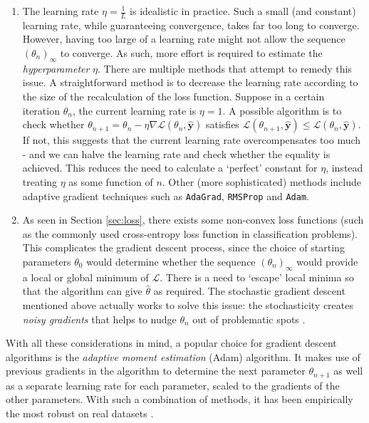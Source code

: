 \documentclass[a4paper,11pt,titlepage]{article}
\theoremstyle{definition}
\theoremstyle{plain}
\theoremstyle{remark}
\begin{document}
\begin{enumerate}
    \item The learning rate $\eta = \frac{1}{L}$ is idealistic in practice. Such a small (and constant) learning rate, while guaranteeing convergence, takes far too long to converge. However, having too large of a learning rate might not allow the sequence $(\theta_n)_\infty$ to converge. As such, more effort is required to estimate the \textit{hyperparameter} $\eta$. There are multiple methods that attempt to remedy this issue. A straightforward method is to decrease the learning rate according to the size of the recalculation of the loss function. Suppose in a certain iteration $\theta_n$, the current learning rate is $\eta = 1$. A possible algorithm is to check whether $\theta_{n+1} = \theta_n - \eta \nabla\mathcal{L}(\theta_n, \mathbf{\hat{y}})$ satisfies $\mathcal{L}(\theta_{n+1}, \mathbf{\hat{y}}) \leq \mathcal{L}(\theta_n, \mathbf{\hat{y}})$. If not, this suggests that the current learning rate overcompensates too much - and we can halve the learning rate and check whether the equality is achieved. This reduces the need to calculate a ‘perfect’ constant for $\eta$, instead treating $\eta$ as some function of $n$. Other (more sophisticated) methods include adaptive gradient techniques such as \texttt{AdaGrad}, \texttt{RMSProp} and \texttt{Adam}.

    \item As seen in Section \ref{sec:loss}, there exists some non-convex loss functions (such as the commonly used cross-entropy loss function in classification problems). This complicates the gradient descent process, since the choice of starting parameters $\theta_0$ would determine whether the sequence $(\theta_n)_\infty$ would provide a local or global minimum of $\mathcal{L}$. There is a need to ‘escape’ local minima so that the algorithm can give $\hat{\theta}$ as required. The stochastic gradient descent mentioned above actually works to solve this issue: the stochasticity creates \textit{noisy gradients} that helps to nudge $\theta_n$ out of problematic spots \cite{nazarathy2021}.
\end{enumerate}

With all these considerations in mind, a popular choice for gradient descent algorithms is the \textit{adaptive moment estimation} (Adam) algorithm. It makes use of previous gradients in the algorithm to determine the next parameter $\theta_{n+1}$ as well as a separate learning rate for each parameter, scaled to the gradients of the other parameters. With such a combination of methods, it has been empirically the most robust on real datasets \cite{nazarathy2021}.
\end{document}

